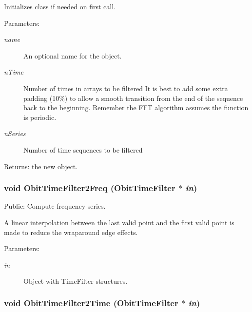 Initializes class if needed on first call. \begin{Desc}
\item[Parameters:]
\begin{description}
\item[{\em name}]An optional name for the object. \item[{\em n\-Time}]Number of times in arrays to be filtered It is best to add some extra padding (10\%) to allow a smooth transition from the end of the sequence back to the beginning. Remember the FFT algorithm assumes the function is periodic. \item[{\em n\-Series}]Number of time sequences to be filtered \end{description}
\end{Desc}
\begin{Desc}
\item[Returns:]the new object. \end{Desc}
\subsubsection{\setlength{\rightskip}{0pt plus 5cm}void Obit\-Time\-Filter2Freq ({\bf Obit\-Time\-Filter} $\ast$ {\em in})}\label{ObitTimeFilter_8c_a12}


Public: Compute frequency series. 

A linear interpolation between the last valid point and the first valid point is made to reduce the wraparound edge effects. \begin{Desc}
\item[Parameters:]
\begin{description}
\item[{\em in}]Object with Time\-Filter structures. \end{description}
\end{Desc}
\subsubsection{\setlength{\rightskip}{0pt plus 5cm}void Obit\-Time\-Filter2Time ({\bf Obit\-Time\-Filter} $\ast$ {\em in})}\label{ObitTimeFilter_8c_a13}


